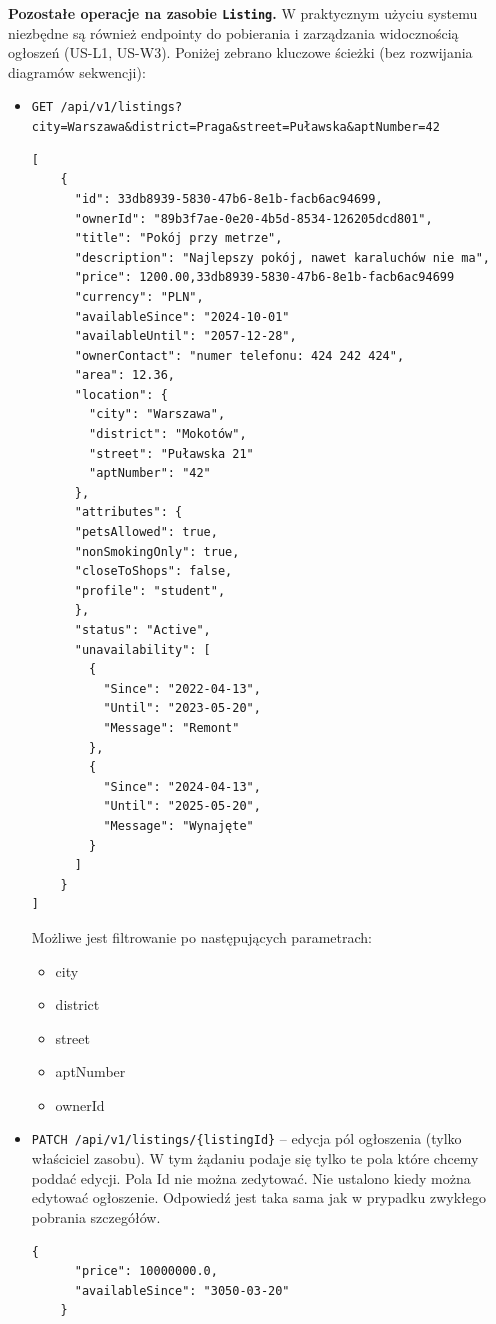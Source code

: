 \documentclass[11pt, a4paper]{article}
\begin{document}
\noindent\textbf{Pozostałe operacje na zasobie \texttt{Listing}.} W praktycznym użyciu systemu niezbędne są również endpointy do pobierania i zarządzania widocznością ogłoszeń (US-L1, US-W3). Poniżej zebrano kluczowe ścieżki (bez rozwijania diagramów sekwencji):
\begin{itemize}
    \item \texttt{GET /api/v1/listings?city=Warszawa\&district=Praga\&street=Puławska\&aptNumber=42}
    \begin{lstlisting}[style=json,caption={Odpowiedź żądania}]
[
    {
      "id": 33db8939-5830-47b6-8e1b-facb6ac94699,
      "ownerId": "89b3f7ae-0e20-4b5d-8534-126205dcd801",
      "title": "Pokój przy metrze",
      "description": "Najlepszy pokój, nawet karaluchów nie ma",
      "price": 1200.00,33db8939-5830-47b6-8e1b-facb6ac94699
      "currency": "PLN",
      "availableSince": "2024-10-01"
      "availableUntil": "2057-12-28",
      "ownerContact": "numer telefonu: 424 242 424",
      "area": 12.36,
      "location": {
        "city": "Warszawa",
        "district": "Mokotów",
        "street": "Puławska 21"
        "aptNumber": "42"
      },
      "attributes": {
      "petsAllowed": true,
      "nonSmokingOnly": true,
      "closeToShops": false,
      "profile": "student",
      },
      "status": "Active",
      "unavailability": [
        {
          "Since": "2022-04-13",
          "Until": "2023-05-20",
          "Message": "Remont"
        },
        {
          "Since": "2024-04-13",
          "Until": "2025-05-20",
          "Message": "Wynajęte"
        }
      ] 
    }
]
    \end{lstlisting}
    Możliwe jest filtrowanie po następujących parametrach:
    \begin{itemize}
        \item city
        \item district
        \item street
        \item aptNumber
        \item ownerId
    \end{itemize}

    \item \texttt{PATCH /api/v1/listings/\{listingId\}} -- edycja pól ogłoszenia (tylko właściciel zasobu). W tym żądaniu podaje się tylko te pola które chcemy poddać edycji. Pola Id nie można zedytować. Nie ustalono kiedy można edytować ogłoszenie. Odpowiedź jest taka sama jak w prypadku zwykłego pobrania szczegółów.
    \begin{lstlisting}[style=json,caption={Żądanie edycji ogłoszenia}]
    {
      "price": 10000000.0,
      "availableSince": "3050-03-20"
    }
    \end{lstlisting}


\end{itemize}
\end{document}
